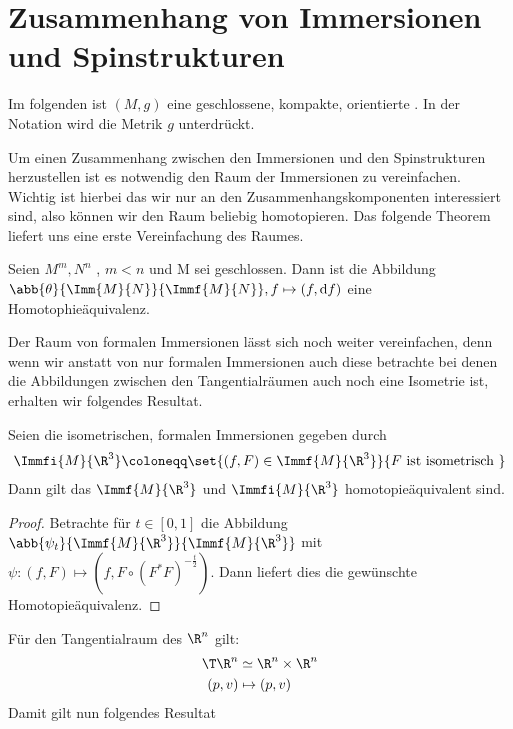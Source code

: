 \section{Zusammenhang von Immersionen und Spinstrukturen}

Im folgenden ist $(M,g)$ eine geschlossene, kompakte, orientierte \mfg.
In der Notation wird die Metrik $g$ unterdrückt.


Um einen Zusammenhang zwischen den Immersionen und den Spinstrukturen
herzustellen ist es notwendig den Raum der Immersionen zu vereinfachen.
Wichtig ist hierbei das wir nur an den Zusammenhangskomponenten interessiert
sind, also können wir den Raum beliebig homotopieren. Das folgende Theorem
liefert uns eine erste Vereinfachung des Raumes.
\begin{Thm}
	Seien $M^m,N^n$ \mfgen, $m<n$ und M sei geschlossen. Dann ist die Abbildung
	$\abb{\theta}{\Imm{M}{N}}{\Immf{M}{N}}, f \mapsto (f,\mathrm{d} f)$ eine Homotophieäquivalenz.
\end{Thm}

Der Raum von formalen Immersionen lässt sich noch weiter vereinfachen, denn wenn
wir anstatt von nur formalen Immersionen auch diese betrachte bei denen
die Abbildungen zwischen den Tangentialräumen auch noch eine Isometrie ist,
erhalten wir folgendes Resultat.


\begin{Satz}
	Seien die isometrischen, formalen Immersionen gegeben durch
	\begin{gather*}
	\Immfi{M}{\R^3} \coloneqq \set{(f,F) \in \Immf{M}{\R^3}}{F \text{ ist isometrisch }}
	\end{gather*}
	Dann gilt das $\Immf{M}{\R^3}$ und $\Immfi{M}{\R^3}$ homotopieäquivalent sind.
	\begin{proof}
		Betrachte für $t \in [0,1]$ die Abbildung $\abb{\psi_t}{\Immf{M}{\R^3}}{\Immf{M}{\R^3}}$ mit 
		$\psi : (f,F) \mapsto (f,F \circ (F^{\ast}F)^{-\frac{t}{2}})$.
		Dann liefert dies die gewünschte Homotopieäquivalenz.
	\end{proof}
\end{Satz}

Für den Tangentialraum des $\R^n$ gilt:
\begin{align*}
	\T \R^n &\simeq \R^n \times \R^n \\
	(p,v) &\mapsto (p,v)
\end{align*}
Damit gilt nun folgendes Resultat

